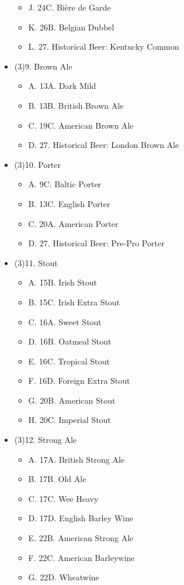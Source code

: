 \begin{multicols*}{2}
\begin{itemize}[noitemsep]
\begin{itemize}
  \item[] J. 24C. Bière de Garde
  \item[] K. 26B. Belgian Dubbel
  \item[] L. 27. Historical Beer: Kentucky Common
\end{itemize}
\item[] (3)9. Brown Ale
\begin{itemize}
  \item[] A. 13A. Dark Mild
  \item[] B. 13B. British Brown Ale
  \item[] C. 19C. American Brown Ale
  \item[] D. 27. Historical Beer: London Brown Ale
\end{itemize}
\item[] (3)10. Porter
\begin{itemize}
  \item[] A. 9C. Baltic Porter
  \item[] B. 13C. English Porter
  \item[] C. 20A. American Porter
  \item[] D. 27. Historical Beer: Pre-Pro Porter
\end{itemize}
\item[] (3)11. Stout
\begin{itemize}
  \item[] A. 15B. Irish Stout
  \item[] B. 15C. Irish Extra Stout
  \item[] C. 16A. Sweet Stout
  \item[] D. 16B. Oatmeal Stout
  \item[] E. 16C. Tropical Stout
  \item[] F. 16D. Foreign Extra Stout
  \item[] G. 20B. American Stout
  \item[] H. 20C. Imperial Stout
\end{itemize}
\item[] (3)12. Strong Ale
\begin{itemize}
  \item[] A. 17A. British Strong Ale
  \item[] B. 17B. Old Ale
  \item[] C. 17C. Wee Heavy
  \item[] D. 17D. English Barley Wine
  \item[] E. 22B. American Strong Ale
  \item[] F. 22C. American Barleywine
  \item[] G. 22D. Wheatwine

\end{itemize}
\end{itemize}
\end{multicols*}
